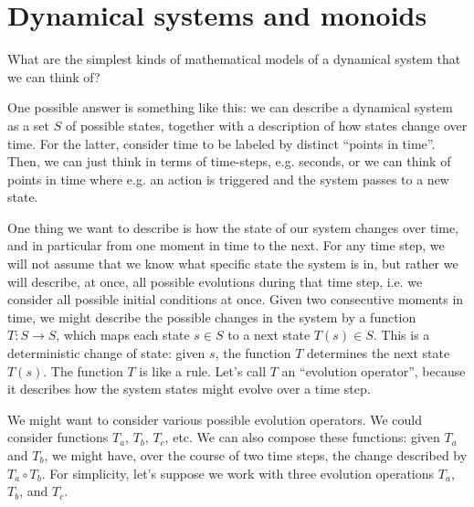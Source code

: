 \section{Dynamical systems and monoids}


What are the simplest kinds of mathematical models of a dynamical system that we can think of?

One possible answer is something like this: we can describe a dynamical system as a set $S$ of possible states, together with a description of how states change over time. For the latter, consider time to be labeled by distinct ``points in time''. Then, we can just think in terms of time-steps, e.g. seconds, or we can think of points in time where e.g. an action is triggered and the system passes to a new state.

One thing we want to describe is how the state of our system changes over time, and in particular from one moment in time to the next. For any time step, we will not assume that we know what specific state the system is in, but rather we will describe, at once, all possible evolutions during that time step, i.e. we consider all possible initial conditions at once. Given two consecutive moments in time, we might describe the possible changes in the system by a function $T : S \rightarrow S$, which maps each state $s \in S$ to a next state $T(s) \in S$. This is a deterministic change of state: given $s$, the function $T$ determines the next state $T(s)$. The function $T$ is like a rule. Let's call $T$ an ``evolution operator'', because it describes how the system states might evolve over a time step.

We might want to consider various possible evolution operators. We could consider functions $T_a$, $T_b$, $T_c$, etc. We can also compose these functions: given $T_a$ and $T_b$, we might have, over the course of two time steps, the change described by $T_a \circ T_b$. For simplicity, let's suppose we work with three evolution operations $T_a$, $T_b$, and $T_c$.

\


\








